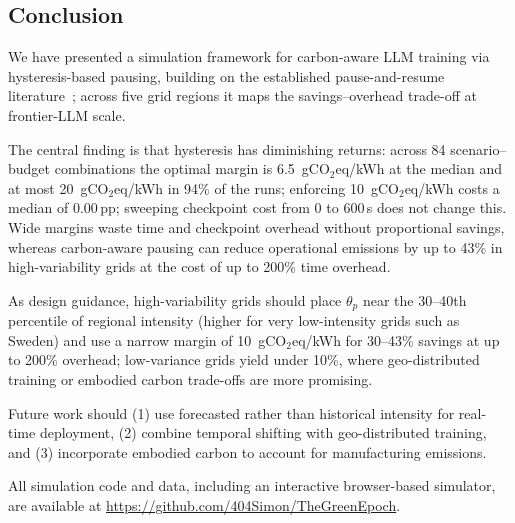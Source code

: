 \documentclass[runningheads]{llncs}
\begin{document}
\subsection{Conclusion}

We have presented a simulation framework for carbon-aware LLM
training via hysteresis-based pausing, building on the established
pause-and-resume
literature~\cite{dodge_measuring_2022,lechowicz_pause_2023}; across
five grid regions it maps the savings--overhead trade-off at frontier-LLM scale.

The central finding is that hysteresis has diminishing returns:
across 84 scenario--budget combinations the optimal margin is
6.5~gCO$_2$eq/kWh at the median and at most 20~gCO$_2$eq/kWh in 94\%
of the runs; enforcing 10~gCO$_2$eq/kWh costs a median of
0.00\,pp; sweeping checkpoint cost from 0 to 600\,s does not
change this. Wide margins waste time and checkpoint overhead
without proportional savings, whereas carbon-aware pausing can reduce
operational emissions by up to 43\% in high-variability grids at the
cost of up to 200\% time overhead.

As design guidance, high-variability grids should place $\theta_p$
near the 30--40th percentile of regional intensity (higher for very
low-intensity grids such as Sweden) and use a narrow margin of
10~gCO$_2$eq/kWh for 30--43\% savings at up to 200\% overhead;
low-variance grids yield under 10\%, where geo-distributed training
or embodied carbon trade-offs are more promising.

Future work should (1) use forecasted rather than historical
intensity for real-time deployment, (2) combine temporal shifting
with geo-distributed training, and (3) incorporate embodied carbon
to account for manufacturing emissions.

All simulation code and data, including an interactive browser-based
simulator, are available at \url{https://github.com/404Simon/TheGreenEpoch}.



\end{document}

